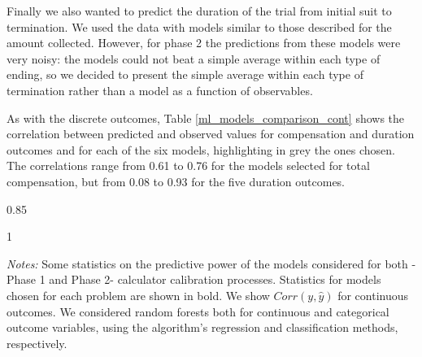 Finally we also wanted to predict the duration of the trial from initial suit to termination. We used the data with models similar to those described for the amount collected. However, for phase 2 the predictions from these models were very noisy: the models could not beat a simple average within each type of ending, so we decided to present the simple average within each type of termination rather than a model as a function of observables. 

As with the discrete outcomes, Table \ref{ml_models_comparison_cont} shows the correlation between predicted and observed values for compensation and duration outcomes and for each of the six models, highlighting in grey the ones chosen. The correlations range from 0.61 to 0.76 for the models selected for total compensation, but from 0.08 to 0.93 for the five duration outcomes. 
\\


\begin{landscape}
\begin{center}
  \begin{table}[H]
     \caption{Fit assessment of continuous calculator models}
     \label{ml_models_comparison_cont}
 \begin{subtable}{0.85\textwidth}
     \caption*{Phase 1: Continuous outcomes}
     \raggedleft
     \scriptsize{}
 \end{subtable}%
   
     \bigskip
 \begin{subtable}{1\textwidth}
       \centering
         \caption*{Phases 2 and 3: Continuous outcomes}
         \scriptsize{}
 \end{subtable}
 
  \scriptsize
   \textit{Notes:} Some statistics on the predictive power of the models considered for both -Phase 1 and Phase 2- calculator calibration processes. Statistics for models chosen for each problem are shown in bold. We show $Corr(y, \hat{y})$ for continuous outcomes. We considered random forests both for continuous and categorical outcome variables, using the algorithm's regression and classification methods, respectively.
 \end{table}
 \end{center}
\end{landscape}


